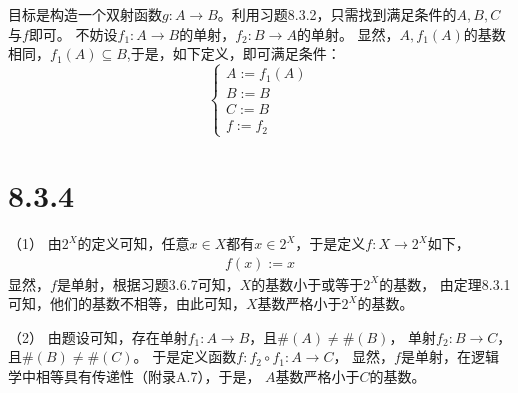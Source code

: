\documentclass{article}
\begin{document}
目标是构造一个双射函数$g: A \rightarrow B$。利用习题8.3.2，只需找到满足条件的$A,B,C$与$f$即可。
不妨设$f_1: A \rightarrow B$的单射，$f_2: B \rightarrow A$的单射。
显然，$A,f_1(A)$的基数相同，$f_1(A) \subseteq B$,于是，如下定义，即可满足条件：
\begin{equation*}
  \begin{cases*}
    A := f_1(A) \\
    B := B      \\
    C := B      \\
    f := f_2
  \end{cases*}
\end{equation*}

\section*{8.3.4}

（1）
由$2^X$的定义可知，任意$x \in X$都有$x \in 2^X$，于是定义$f: X \rightarrow 2^X$如下，
\begin{align*}
  f(x) := x
\end{align*}
显然，$f$是单射，根据习题3.6.7可知，$X$的基数小于或等于$2^X$的基数，
由定理8.3.1可知，他们的基数不相等，由此可知，$X$基数严格小于$2^X$的基数。

（2）
由题设可知，存在单射$f_1: A \rightarrow B$，且$\#(A) \neq \#(B)$，
单射$f_2: B \rightarrow C$，且$\#(B) \neq \#(C)$。
于是定义函数$f: f_2 \circ f_1: A \rightarrow C$，
显然，$f$是单射，在逻辑学中相等具有传递性（附录A.7），于是，
$A$基数严格小于$C$的基数。
\end{document}
